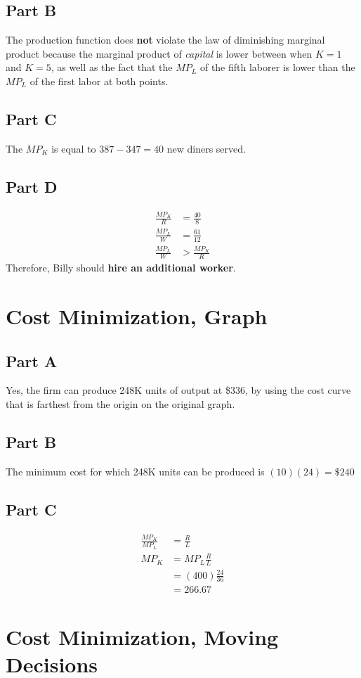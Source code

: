 \documentclass[8pt]{extarticle}
\begin{document}
{\subsection*{Part B}
The production function does \textbf{not} violate the law of diminishing marginal product because the marginal product of \textit{capital} is lower between when $K=1$ and $K=5$, as well as the fact that the $MP_L$ of the fifth laborer is lower than the $MP_L$ of the first labor at both points.
\subsection*{Part C}
The $MP_K$ is equal to $387-347 = 40$ new diners served.
\subsection*{Part D}
\begin{align*}
	\frac{MP_K}{R} &= \frac{40}{8} \\
	\frac{MP_L}{W} &= \frac{61}{12} \\
	\frac{MP_L}{W} &> \frac{MP_K}{R}
\end{align*}
Therefore, Billy should \textbf{hire an additional worker}.
\section{Cost Minimization, Graph}
\subsection*{Part A}
Yes, the firm can produce 248K units of output at \$336, by using the cost curve that is farthest from the origin on the original graph.
\subsection*{Part B}
The minimum cost for which 248K units can be produced is $(10)(24) = \$240 $
\subsection*{Part C}
\begin{align*}
	\frac{MP_K}{MP_L} &= \frac{R}{L} \\
	MP_K &= MP_L \frac{R}{L} \\
	&= (400)\frac{24}{36} \\
	&= \boxed{266.67}
\end{align*}
\section{Cost Minimization, Moving Decisions}
}
\end{document}
